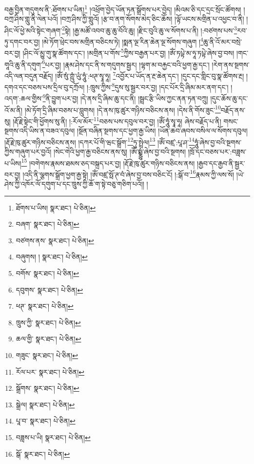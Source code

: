 བརྒྱ་བྱིན་གདུགས་ནི་:ཐོགས་པ་ཡིན།\footnote{ཐོགས་པ་ཡིས།  སྣར་ཐང་།  པེ་ཅིན། } །འཕྲོག་བྱེད་ཡོན་ཏན་སྒྲོགས་པར་བྱེད། །མིའམ་ཅི་དང་དྲང་སྲོང་ཚོགས། །བཀྲ་ཤིས་གླུ་ནི་ལེན་པའོ། །བཀྲ་ཤིས་ཀྱི་གླུའོ། །རྩ་བ་ནག་སོགས་མེད་ཅིང་ཆོས། །ལྟོ་ཡངས་མགྲིན་པ་འཕྱང་བ་ནི། །ཤིང་ལོ་ཕྱེ་མའི་སྟེང་གཞག་\footnote{བཞག་  སྣར་ཐང་།  པེ་ཅིན། }སྟེ། །རྒྱ་མཚོ་འབབ་ཆུ་ཆུ་བོའི་ཆུ། །རྫིང་བུའི་ཆུ་ལ་སོགས་པ་ནི། །:བཙགས་པས་\footnote{བཙགས་ནས་  སྣར་ཐང་།  པེ་ཅིན། }རབ་ཏུ་དགང་བར་བྱ། །མེ་ཏོག་ཕྲེང་བས་མགྲིན་བཅིངས་ཏེ། །སྨན་ལྔ་རིན་ཆེན་ལྔ་སོགས་གཞུག །\footnote{བཞུགས། །  སྣར་ཐང་།  པེ་ཅིན། }ཆུ་ནི་འོ་མར་བསྲེ་བར་བྱ། །ཤིང་ལོ་མྱུ་གུ་སྣ་ཚོགས་དང་། །མགྲིན་པ་གོས་\footnote{བགོས་  སྣར་ཐང་།  པེ་ཅིན། }ཀྱིས་བརྒྱན་པར་བྱ། །ཨོཾ་ཏཔྟེ་མ་ཧཱ་ཏཔྟེ་ཞེས་བྱ་བས། །གང་གཱའི་ཆུ་ནི་དགུག་\footnote{དབུགས་  སྣར་ཐང་།  པེ་ཅིན། }པར་བྱ། །རྣམ་ཤེས་དང་ནི་ས་གདུགས་སྦྱར། །ལྷག་མ་བརྐྱང་བའི་ཕྱག་རྒྱ་དང་། །རེག་ནས་སྔགས་འདི་ལན་བདུན་བརྗོད། །ཨོཾ་སུཾ་ཀྵུཾ་ཡུཾ་ཧཱུཾ་:ཕཊ་སྭཱ་ཧཱ། \footnote{ཕཊ་  སྣར་ཐང་།  པེ་ཅིན། }འབྱོར་པ་ཡོད་ན་རྔ་ཆེན་དང་། །དུང་དང་གླིང་བུ་སྣ་ཚོགས་རྔ། །དགའ་དང་བཅས་པས་དྲིལ་བུ་དཀྲོལ། །:ཁྲུས་ཀྱིས་\footnote{ཁྲུས་ཀྱི་  སྣར་ཐང་།  པེ་ཅིན། }དུས་སུ་སྦྱར་བར་བྱ། །དང་པོར་དྲི་ཞིམ་མར་ནག་དང་། །འདག་:ཆལ་གྱིས་\footnote{ཆལ་གྱི་  སྣར་ཐང་།  པེ་ཅིན། }ནི་བྱུག་པར་བྱ། །དེ་ནས་དྲི་ཞིམ་ཆུ་དང་ནི། །སྦྲང་རྩི་ཡིས་ཀྱང་ནན་ཏན་བཀྲུ། །དུང་ཆོས་ཆུ་དང་འོ་མ་ནི། །མེ་ཏོག་དྲི་ཞིམ་བཅས་པ་བླུགས། །དེ་ནས་ཁུ་ཚུར་གཉིས་བཅིངས་ནས། །དེས་ནི་གོས་ཟུང་\footnote{གཟུང་  སྣར་ཐང་།  པེ་ཅིན། }བརྗོད་ནས་སུ། །རྡོ་རྗེ་སྟེང་གི་ཕྱོགས་སུ་ནི། །:རོལ་མོར་\footnote{རོལ་པར་  སྣར་ཐང་།  པེ་ཅིན། }བཅས་པས་དབུལ་བར་བྱ། །ཨོཾ་ཧཱུཾ་སྭཱ་ཧཱ། ཞེས་བརྗོད་པ་ནི། གསང་སྔགས་འདི་ཡིས་ན་བཟའ་དབུལ། །སྔོན་བཞིན་སྔགས་དང་ཕྱག་རྒྱ་ཡིས། །ཡོན་ཆབ་ཞབས་བསིལ་ལ་སོགས་དབུལ། །རྡོ་རྗེ་ཁུ་ཚུར་གཉིས་བཅིངས་ནས། །དཀར་པོ་གི་ཝང་སྒྲོག་\footnote{སྒྲོགས་  སྣར་ཐང་།  པེ་ཅིན། }ཏུ་སྤྲེལ།\footnote{སྒྲེལ།  སྣར་ཐང་།  པེ་ཅིན། } །ཨོཾ་བཛྲ་:པཱ་ཤ་\footnote{པཱ་བ་  སྣར་ཐང་།  པེ་ཅིན། }ཧཱུཾ་ཞེས་བྱ་བའི་སྔགས་ཀྱིས་གཞུག་པར་བྱའོ། །སེང་གེའི་ཕྱག་རྒྱ་བཅིངས་ནས་སུ། །ཨོཾ་སྨྼྻུཾ་ཞེས་བྱ་བའི་སྔགས། །ཁྲོ་དང་བཅས་པར་:བཟླས་པ་ཡིས།\footnote{བཟླས་པ་ཡི།  སྣར་ཐང་།  པེ་ཅིན། } །བགེགས་རྣམས་ཐམས་ཅད་བསྐྲད་པར་བྱ། །རྡོ་རྗེ་ཁུ་ཚུར་གཉིས་བཅིངས་ནས། །རྒྱབ་དང་རྒྱབ་ནི་སྦྱར་བར་བྱ། །འདི་ནི་ལྕགས་སྒྲོག་ཕྱག་རྒྱ་སྟེ། །ཨོཾ་བཛྲ་སྥོ་ཊ་བཾ་ཞེས་བྱ་བས་བཅིང་ངོ། །:སྒོ་བ་\footnote{སྒོ་  སྣར་ཐང་།  པེ་ཅིན། }རྣམས་ཀྱི་ལས་སོ། །ཡེ་ཤེས་ཀྱི་འཁོར་ལོ་དགུག་པ་དང་ཁྲུས་ཀྱི་ཆོ་ག་སྟེ་བཅུ་གཅིག་པའོ།། །

